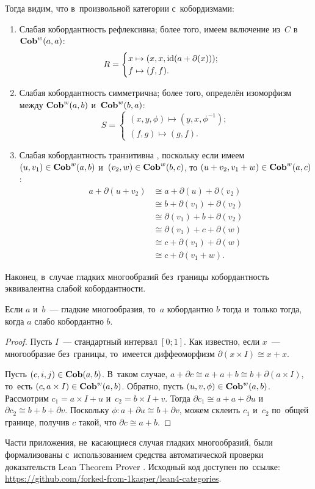 \documentclass[a4paper,oneside]{article}
\begin{document}
Тогда видим, что в~произвольной категории с~кобордизмами:
\begin{enumerate}
  \item Слабая кобордантность рефлексивна; более того, имеем включение из~$C$ в~$\mathbf{Cob}^w(a, a)$:
  \[
    R = \begin{cases}
      x \mapsto (x, x, \mathrm{id}(a + \partial(x))); \\
      f \mapsto (f, f).
    \end{cases}
  \]
  \item Слабая кобордантность симметрична; более того, определён изоморфизм между $\mathbf{Cob}^w(a, b)$ и~$\mathbf{Cob}^w(b, a)$:
  \[
    S = \begin{cases}
      (x, y, \phi) \mapsto (y, x, \phi^{-1}); \\
      (f, g) \mapsto (g, f).
    \end{cases}
  \]
  \item Слабая кобордантность транзитивна \cite{Weston}, поскольку если имеем $(u, v_1) \in \mathbf{Cob}^w(a, b)$ и~$(v_2, w) \in \mathbf{Cob}^w(b, c)$,
  то $(u + v_2, v_1 + w) \in \mathbf{Cob}^w(a, c)$:
  \[
  \begin{aligned}
    a + \partial(u + v_2) & \cong a + \partial(u) + \partial(v_2) \\
                          & \cong b + \partial(v_1) + \partial(v_2) \\
                          & \cong \partial(v_1) + b + \partial(v_2) \\
                          & \cong \partial(v_1) + c + \partial(w) \\
                          & \cong c + \partial(v_1) + \partial(w) \\
                          & \cong c + \partial(v_1 + w).
  \end{aligned}
  \]
\end{enumerate}

Наконец, в~случае гладких многообразий без~границы кобордантность эквивалентна слабой кобордантности.

\begin{statement*}
  Если $a$ и~$b$~— гладкие многообразия, то~$a$ кобордантно $b$ тогда и~только тогда,
  когда $a$ слабо кобордантно $b$.
\end{statement*}

\begin{proof}
  Пусть $I$~— стандартный интервал $[0; 1]$.
  Как известно, если $x$~— многообразие без~границы,
  то~имеется диффеоморфизм $\partial(x \times I) \cong x + x$.

  Пусть $(c, i, j) \in \mathbf{Cob}(a, b)$. В~таком случае, $a + \partial c \cong a + a + b \cong b + \partial(a \times I)$,
  то~есть $(c, a \times I) \in \mathbf{Cob}^w(a, b)$.
  Обратно, пусть $(u, v, \phi) \in \mathbf{Cob}^w(a, b)$. Рассмотрим $c_1 = a \times I + u$ и~$c_2 = b \times I + v$.
  Тогда $\partial c_1 \cong a + a + \partial u $ и~$\partial c_2 \cong b + b + \partial v$.
  Поскольку $\phi : a + \partial u \cong b + \partial v$, можем склеить $c_1$ и~$c_2$ по~общей
  границе, получив $c$ такой, что $\partial c \cong a + b$.
\end{proof}

Части приложения, не~касающиеся случая гладких многообразий, были формализованы с~использованием
средства автоматической проверки доказательств Lean Theorem Prover \cite{Lean}. Исходный код доступен по~ссылке:
\url{https://github.com/forked-from-1kasper/lean4-categories}.

\pagebreak
\end{document}
